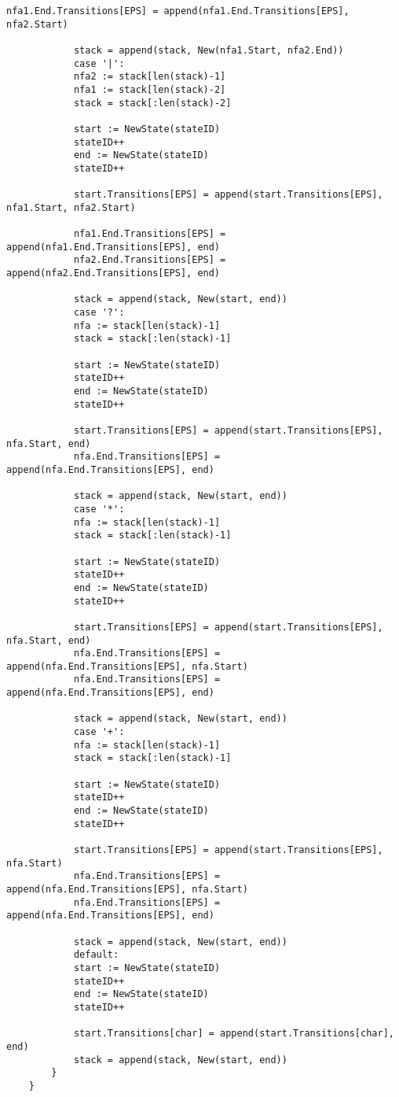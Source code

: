 \begin{appendices}
\begin{lstlisting}[caption=Модуль NFA, extendedchars=\true]
			nfa1.End.Transitions[EPS] = append(nfa1.End.Transitions[EPS], nfa2.Start)
			
			stack = append(stack, New(nfa1.Start, nfa2.End))
			case '|':
			nfa2 := stack[len(stack)-1]
			nfa1 := stack[len(stack)-2]
			stack = stack[:len(stack)-2]
			
			start := NewState(stateID)
			stateID++
			end := NewState(stateID)
			stateID++
			
			start.Transitions[EPS] = append(start.Transitions[EPS], nfa1.Start, nfa2.Start)
			
			nfa1.End.Transitions[EPS] = append(nfa1.End.Transitions[EPS], end)
			nfa2.End.Transitions[EPS] = append(nfa2.End.Transitions[EPS], end)
			
			stack = append(stack, New(start, end))
			case '?':
			nfa := stack[len(stack)-1]
			stack = stack[:len(stack)-1]
			
			start := NewState(stateID)
			stateID++
			end := NewState(stateID)
			stateID++
			
			start.Transitions[EPS] = append(start.Transitions[EPS], nfa.Start, end)
			nfa.End.Transitions[EPS] = append(nfa.End.Transitions[EPS], end)
			
			stack = append(stack, New(start, end))
			case '*':
			nfa := stack[len(stack)-1]
			stack = stack[:len(stack)-1]
			
			start := NewState(stateID)
			stateID++
			end := NewState(stateID)
			stateID++
			
			start.Transitions[EPS] = append(start.Transitions[EPS], nfa.Start, end)
			nfa.End.Transitions[EPS] = append(nfa.End.Transitions[EPS], nfa.Start)
			nfa.End.Transitions[EPS] = append(nfa.End.Transitions[EPS], end)
			
			stack = append(stack, New(start, end))
			case '+':
			nfa := stack[len(stack)-1]
			stack = stack[:len(stack)-1]
			
			start := NewState(stateID)
			stateID++
			end := NewState(stateID)
			stateID++
			
			start.Transitions[EPS] = append(start.Transitions[EPS], nfa.Start)
			nfa.End.Transitions[EPS] = append(nfa.End.Transitions[EPS], nfa.Start)
			nfa.End.Transitions[EPS] = append(nfa.End.Transitions[EPS], end)
			
			stack = append(stack, New(start, end))
			default:
			start := NewState(stateID)
			stateID++
			end := NewState(stateID)
			stateID++
			
			start.Transitions[char] = append(start.Transitions[char], end)
			stack = append(stack, New(start, end))
		}
	}
	

\end{lstlisting}
\end{appendices}
